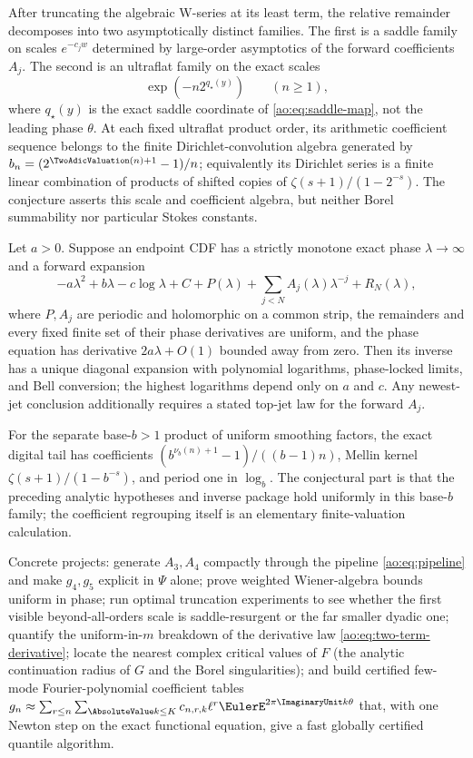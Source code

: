 \begin{conjecture}
\label{ao:conj:transseries}
After truncating the algebraic W-series at its least term, the relative
remainder decomposes into two asymptotically distinct families.  The first is
a saddle family on scales $e^{-c_jw}$ determined by large-order asymptotics
of the forward coefficients $A_j$.  The second is an ultraflat family on the
exact scales
\[
 \exp(-n2^{q_\star(y)})\qquad(n\ge1),
\]
where $q_\star(y)$ is the exact saddle coordinate of
\eqref{ao:eq:saddle-map}, not the leading phase $\theta$.  At each fixed
ultraflat product order, its arithmetic coefficient sequence belongs to the
finite Dirichlet-convolution algebra generated by
$b_n=(2^{\TwoAdicValuation(n)+1}-1)/n$; equivalently its Dirichlet series is a
finite linear combination of products of shifted copies of
$\zeta(s+1)/(1-2^{-s})$.  The conjecture asserts this scale and coefficient
algebra, but neither Borel summability nor particular Stokes constants.
\end{conjecture}

\begin{conjecture}
\label{ao:conj:universal-class}
Let $a>0$.  Suppose an endpoint CDF has a strictly monotone exact phase
$\lambda\to\infty$ and a forward expansion
\[
 -a\lambda^2+b\lambda-c\log\lambda+C+P(\lambda)
 +\sum_{j<N}A_j(\lambda)\lambda^{-j}+R_N(\lambda),
\]
where $P,A_j$ are periodic and holomorphic on a common strip, the remainders
and every fixed finite set of their phase derivatives are uniform, and the
phase equation has derivative $2a\lambda+O(1)$ bounded away from zero.  Then
its inverse has a unique diagonal expansion with polynomial logarithms,
phase-locked limits, and Bell conversion; the highest logarithms depend only
on $a$ and $c$.  Any newest-jet conclusion additionally requires a stated
top-jet law for the forward $A_j$.

For the separate base-$b>1$ product of uniform smoothing factors, the exact
digital tail has coefficients
$(b^{\nu_b(n)+1}-1)/((b-1)n)$, Mellin kernel
$\zeta(s+1)/(1-b^{-s})$, and period one in $\log_b$.  The conjectural part is
that the preceding analytic hypotheses and inverse package hold uniformly in
this base-$b$ family; the coefficient regrouping itself is an elementary
finite-valuation calculation.
\end{conjecture}

Concrete projects: generate $A_3,A_4$ compactly through the pipeline
\eqref{ao:eq:pipeline} and make $g_4,g_5$ explicit in $\Psi$ alone;
prove weighted Wiener-algebra bounds uniform in phase; run optimal
truncation experiments to see whether the first visible
beyond-all-orders scale is saddle-resurgent or the far smaller
dyadic one; quantify the uniform-in-$m$ breakdown of the derivative
law \eqref{ao:eq:two-term-derivative}; locate the nearest complex
critical values of $F$ (the analytic continuation radius of $G$ and
the Borel singularities); and build certified few-mode
Fourier-polynomial coefficient tables
$g_n\approx\sum_{r\le n}\sum_{\AbsoluteValue k\le K}c_{n,r,k}\ell^{r}
\EulerE^{2\pi\ImaginaryUnit k\theta}$ that, with one Newton step on the exact
functional equation, give a fast globally certified quantile
algorithm.

